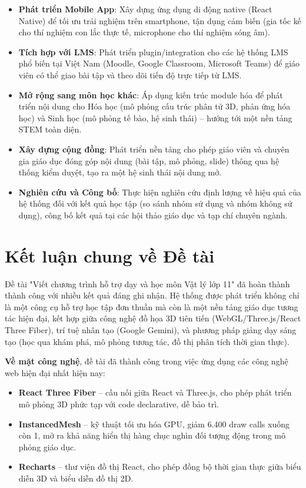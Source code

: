 \begin{itemize}
    \item \textbf{Phát triển Mobile App}: Xây dựng ứng dụng di động native (React Native) để tối ưu trải nghiệm trên smartphone, tận dụng cảm biến (gia tốc kế cho thí nghiệm con lắc thực tế, microphone cho thí nghiệm sóng âm).
    
    \item \textbf{Tích hợp với LMS}: Phát triển plugin/integration cho các hệ thống LMS phổ biến tại Việt Nam (Moodle, Google Classroom, Microsoft Teams) để giáo viên có thể giao bài tập và theo dõi tiến độ trực tiếp từ LMS.
    
    \item \textbf{Mở rộng sang môn học khác}: Áp dụng kiến trúc module hóa để phát triển nội dung cho Hóa học (mô phỏng cấu trúc phân tử 3D, phản ứng hóa học) và Sinh học (mô phỏng tế bào, hệ sinh thái) – hướng tới một nền tảng STEM toàn diện.
    
    \item \textbf{Xây dựng cộng đồng}: Phát triển nền tảng cho phép giáo viên và chuyên gia giáo dục đóng góp nội dung (bài tập, mô phỏng, slide) thông qua hệ thống kiểm duyệt, tạo ra một hệ sinh thái nội dung mở.
    
    \item \textbf{Nghiên cứu và Công bố}: Thực hiện nghiên cứu định lượng về hiệu quả của hệ thống đối với kết quả học tập (so sánh nhóm sử dụng và nhóm không sử dụng), công bố kết quả tại các hội thảo giáo dục và tạp chí chuyên ngành.
\end{itemize}

\section{Kết luận chung về Đề tài}

Đề tài "Viết chương trình hỗ trợ dạy và học môn Vật lý lớp 11" đã hoàn thành thành công với nhiều kết quả đáng ghi nhận. Hệ thống được phát triển không chỉ là một công cụ hỗ trợ học tập đơn thuần mà còn là một nền tảng giáo dục tương tác hiện đại, kết hợp giữa công nghệ đồ họa 3D tiên tiến (WebGL/Three.js/React Three Fiber), trí tuệ nhân tạo (Google Gemini), và phương pháp giảng dạy sáng tạo (học qua khám phá, mô phỏng tương tác, đồ thị phân tích thời gian thực).

\textbf{Về mặt công nghệ}, đề tài đã thành công trong việc ứng dụng các công nghệ web hiện đại nhất hiện nay:
\begin{itemize}
    \item \textbf{React Three Fiber} – cầu nối giữa React và Three.js, cho phép phát triển mô phỏng 3D phức tạp với code declarative, dễ bảo trì.
    \item \textbf{InstancedMesh} – kỹ thuật tối ưu hóa GPU, giảm 6.400 draw calls xuống còn 1, mở ra khả năng hiển thị hàng chục nghìn đối tượng động trong mô phỏng giáo dục.
    \item \textbf{Recharts} – thư viện đồ thị React, cho phép đồng bộ thời gian thực giữa biểu diễn 3D và biểu diễn đồ thị 2D.
\end{itemize}

